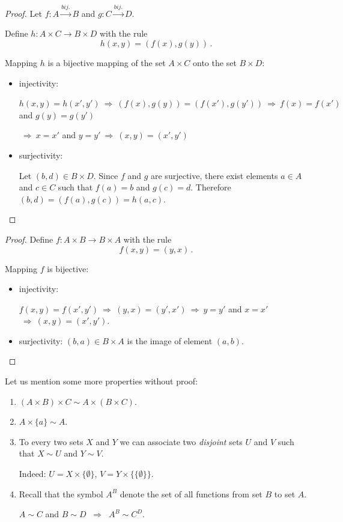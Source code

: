 \documentclass[11pt,paper=b5,footinclude,headinclude]{scrbook} %
\def\sledi {{~\Rightarrow~}}
\theoremstyle{remark}
\theoremstyle{definition} %
\theoremstyle{theorem} %
\begin{document}
\begin{proof}
Let $f:A\overset{bij.}{\to}B$ and $g:C\overset{bij.}{\to}D$.

Define $h:A\times C\to B \times D$
with the rule
$$h(x,y) = (f(x),g(y))\,.$$

Mapping $h$ is a bijective mapping of the set $A\times C$ onto the set $B\times D$:
\begin{itemize}
  \item injectivity:

  $h(x,y) = h(x',y')\sledi
  (f(x),g(y)) = (f(x'),g(y')) \sledi f(x) = f(x')$ and $g(y) = g(y')$

  $\sledi x = x'$ and $y = y' \sledi (x,y) = (x',y')$
  \item surjectivity:

  Let $(b,d)\in B\times D$. Since $f$ and $g$ are surjective, there exist elements $a\in A$
  and $c\in C$ such that $f(a) = b$ and $g(c) = d$. Therefore $(b,d) = (f(a),g(c)) = h(a,c)$.
\end{itemize}
\end{proof}

\bigskip



\begin{proof} Define  $f:A\times B\to B\times A$ with the rule
$$f(x,y) = (y,x)\,.$$

Mapping $f$ is bijective:
\begin{itemize}
  \item injectivity:

  $f(x,y) = f(x',y') \sledi (y,x) = (y',x') \sledi y = y'$ and $x = x'$ $\sledi (x,y) = (x',y')$.

  \item surjectivity: $(b,a)\in B\times A$ is the image of element $(a,b)$.
\end{itemize}
\end{proof}

Let us mention some more properties without proof:
\begin{enumerate}
  \item $(A\times B)\times C\sim A\times (B\times C)$.
  \item $A\times \{a\}\sim A$.
  \item To every two sets $X$ and $Y$ we can associate two {\em disjoint} sets
  $U$ and $V$ such that $X\sim U$ and $Y\sim V$.

  Indeed: $U = X\times\{\emptyset\}$, $V = Y\times\{\{\emptyset\}\}$.
  \item Recall that the symbol $A^B$ denote the set of all functions from set $B$ to set $A$.

  $A\sim C$ and $B\sim D$ $\sledi$ $A^B\sim C^D$.
\end{enumerate}
\end{document}
